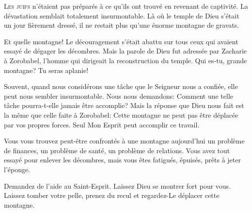 


\lettrine{L}{es juifs} n'étaient pas préparés à ce qu'ils ont trouvé
 en revenant de captivité. La dévastation semblait totalement insurmontable.
 Là où le temple de Dieu s'était un jour fièrement dressé,
 il ne restait plus qu'une énorme montagne de gravats. 

Et quelle montagne! Le découragement s'était abattu sur tous ceux
 qui avaient essayé de dégager les décombres. Mais la parole de Dieu
 fut adressée par Zacharie à Zorobabel, l'homme qui dirigeait
 la reconstruction du temple.
 \Og Qui es-tu, grande montagne? Tu seras aplanie! \Fg{}

Souvent, quand nous considérons une tâche que le Seigneur nous a confiée,
 elle peut nous sembler insurmontable. Nous nous demandons: 
 \Og Comment une telle tâche pourra-t-elle jamais être accomplie? \Fg{}
 Mais la réponse que Dieu nous fait est la même que celle faite à Zorobabel:
 \Og Cette montagne ne peut pas être déplacée par vos propres forces.
 Seul Mon Esprit peut accomplir ce travail. \Fg{}

Vous vous trouvez peut-être confrontés à une montagne aujourd'hui
 \ocadr un problème de finances, un problème de santé,
 un problème de relations. Vous avez tout essayé pour
 enlever les décombres, mais vous êtes fatigués, épuisés, prêts à jeter l'éponge.


Demandez de l'aide au Saint-Esprit. Laissez Dieu se montrer fort pour vous.
 Laissez tomber votre pelle, prenez du recul et regardez-Le
 déplacer cette montagne. 

\dvrule



